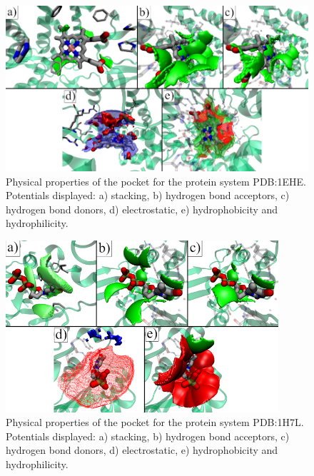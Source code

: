 \begin{figure}[H]
  \centering
  \includegraphics[width=1\textwidth]{figures/appendix/benchmark_prot/1ehe.png}
  \caption{\label{fig:appx_benchmark/1ehe} Physical properties of the pocket for the protein system PDB:1EHE. Potentials displayed: a) stacking, b) hydrogen bond acceptors, c) hydrogen bond donors, d) electrostatic, e) hydrophobicity and hydrophilicity.}
\end{figure}

\begin{figure}[H]
  \centering
  \includegraphics[width=0.9\textwidth]{figures/appendix/benchmark_prot/1h7l.png}
  \caption{\label{fig:appx_benchmark/1h7l} Physical properties of the pocket for the protein system PDB:1H7L. Potentials displayed: a) stacking, b) hydrogen bond acceptors, c) hydrogen bond donors, d) electrostatic, e) hydrophobicity and hydrophilicity.}
\end{figure}

